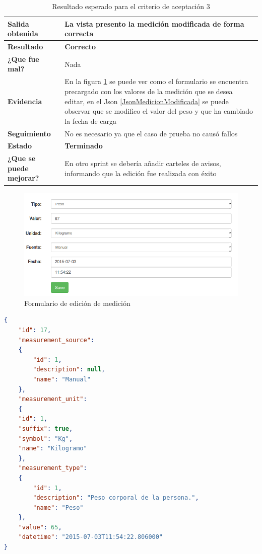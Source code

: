 \documentclass[a4paper,12pt]{article}
\begin{document}
            {\scriptsize
	\begin{table}[h]
	\centering
	\begin{tabular}{|l|p{10cm}|}
	    \hline 
	    \textbf{Salida obtenida}& La vista presento la medición modificada de forma correcta\\ \hline
	    \textbf{Resultado}& \textbf{Correcto}\\ \hline
        \textbf{¿Que fue mal?}& Nada\\ \hline      
        \textbf{Evidencia}&  En la figura \ref{edicion_medicion} se puede ver como el formulario se encuentra precargado con los valores de la medición que se desea editar, en el Json \ref{JsonMedicionModificada} se puede observar que se modifico el valor del peso y que ha cambiado la fecha de carga \\ \hline
        \textbf{Seguimiento}& No es necesario ya que el caso de prueba no causó
fallos\\ \hline
        \textbf{Estado}& \textbf{Terminado}\\ \hline        
        \textbf{¿Que se puede mejorar?}& En otro sprint se debería añadir carteles de avisos, informando que la edición fue realizada con éxito \\ \hline              
	    \end{tabular}
        \caption{Resultado esperado para el criterio de aceptación 3}
    	\end{table}
	}
\begin{figure}[h]
        \centering
        \includegraphics[width=1\textwidth]{img/2-prueba_3}
        \caption{Formulario de edición de medición}
		\label{edicion_medicion}
\end{figure}

\begin{lstlisting}[language=json,firstnumber=1,  breaklines=true, caption= Json de las medicion modificada del perfil id:3, label=JsonMedicionModificada]
{
	"id": 17,
    "measurement_source": 
	{
    	"id": 1,
	    "description": null,
	    "name": "Manual"
	},
	"measurement_unit": 
	{
    "id": 1,
    "suffix": true,
    "symbol": "Kg",
    "name": "Kilogramo"
	},
	"measurement_type": 
    {
        "id": 1,
        "description": "Peso corporal de la persona.",
        "name": "Peso"
    },
    "value": 65,
    "datetime": "2015-07-03T11:54:22.806000"
}
\end{lstlisting}
\clearpage  
\end{document}
